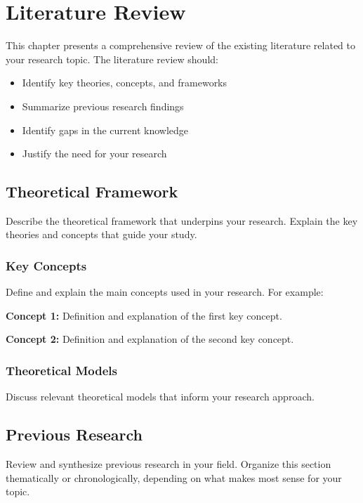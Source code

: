 
\chapter{Literature Review}
\label{literature_review}
\thispagestyle{empty}


This chapter presents a comprehensive review of the existing literature related to your research topic. The literature review should:

\begin{itemize}
    \item Identify key theories, concepts, and frameworks
    \item Summarize previous research findings
    \item Identify gaps in the current knowledge
    \item Justify the need for your research
\end{itemize}

\section{Theoretical Framework}

Describe the theoretical framework that underpins your research. Explain the key theories and concepts that guide your study.

\subsection{Key Concepts}

Define and explain the main concepts used in your research. For example:

\textbf{Concept 1:} Definition and explanation of the first key concept.

\textbf{Concept 2:} Definition and explanation of the second key concept.

\subsection{Theoretical Models}

Discuss relevant theoretical models that inform your research approach.

\section{Previous Research}

Review and synthesize previous research in your field. Organize this section thematically or chronologically, depending on what makes most sense for your topic.

